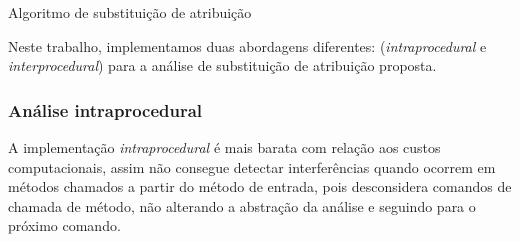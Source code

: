 \begin{algorithm}[h]
    \caption{Algoritmo de substituição de atribuição}
    

    
   
    
    \BlankLine
\end{algorithm}

Neste trabalho, implementamos duas abordagens diferentes: (\emph{intraprocedural} e \emph{interprocedural}) para a análise de substituição de atribuição proposta.

\subsubsection*{Análise intraprocedural}

A implementação \emph{intraprocedural} é mais barata com relação aos custos computacionais, assim não consegue detectar interferências quando ocorrem em métodos chamados a partir do método de entrada, pois desconsidera comandos de chamada de método, não alterando a abstração da análise e seguindo para o próximo comando.


